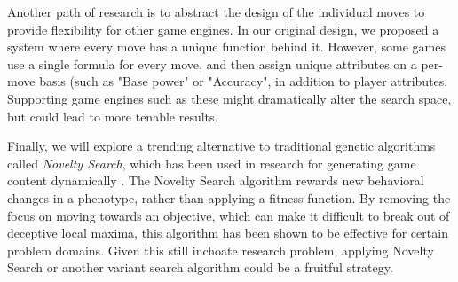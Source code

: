 \documentclass{acm_proc_article-sp}
\begin{document}
	Another path of research is to abstract the design of the individual moves to provide flexibility for other game engines. In our original design, we proposed a system where every move has a unique function behind it. However, some games use a single formula for every move, and then assign unique attributes on a per-move basis (such as "Base power" or "Accuracy", in addition to player attributes. Supporting game engines such as these might dramatically alter the search space, but could lead to more tenable results.
    
	Finally, we will explore a trending alternative to traditional genetic algorithms called \textit{Novelty Search}, which has been used in research for generating game content dynamically \cite{novelty_search}. The Novelty Search algorithm rewards new behavioral changes in a phenotype, rather than applying a fitness function. By removing the focus on moving towards an objective, which can make it difficult to break out of deceptive local maxima, this algorithm has been shown to be effective for certain problem domains. Given this still inchoate research problem, applying Novelty Search or another variant search algorithm could be a fruitful strategy.
    
%






\balancecolumns
\end{document}
